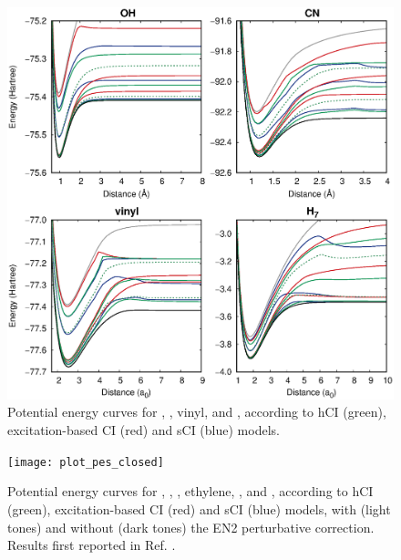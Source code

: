 \documentclass[aip,jcp,preprint,noshowkeys,superscriptaddress]{revtex4-1}
\begin{document}
\clearpage


\begin{figure}%
\includegraphics[width=1.0\linewidth]{plot_pes}
\caption{
Potential energy curves for , , vinyl, and ,
according to hCI (green), excitation-based CI (red) and sCI (blue) models.
}
\label{fig:plot_pes}
\end{figure}


\begin{figure}%
\texttt{[image: plot\_pes\_closed]}
\caption{
Potential energy curves for , , , ethylene, , and ,
according to hCI (green), excitation-based CI (red) and sCI (blue) models,
with (light tones) and without (dark tones) the EN2 perturbative correction.
Results first reported in Ref. .
}
\label{fig:plot_pes_closed}
\end{figure}
\end{document}
